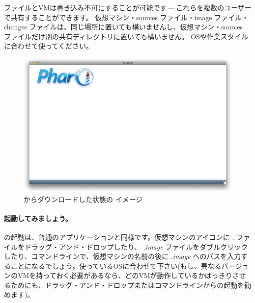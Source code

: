 \documentclass[a4paper,10pt,twoside]{book}
\begin{document}
 ファイルとVMは書き込み不可にすることが可能です\,---\,これらを複数のユーザーで共有することができます。
仮想マシン・sources ファイル・image ファイル・changes ファイルは、同じ場所に置いても構いませんし、仮想マシン・sources ファイルだけ別の共有ディレクトリに置いても構いません。
OSや作業スタイルに合わせて使ってください。


\begin{figure}[htb]
\centerline {\includegraphics[width=\textwidth]{startup}}
\caption{\pbe からダウンロードした状態の イメージ}
\end{figure}

\paragraph{起動してみましょう。} \pharo の起動は、普通のアプリケーションと同様です。仮想マシンのアイコンに \emph{.} ファイルをドラッグ・アンド・ドロップしたり、 \emph{.image} ファイルをダブルクリックしたり、コマンドラインで、仮想マシンの名前の後に \emph{.image} へのパスを入力することになるでしょう。使っているOSに合わせて下さい(もし、異なるバージョンのVMを持っておく必要があるなら、どのVMが動作しているかはっきりさせるためにも、ドラッグ・アンド・ドロップまたはコマンドラインからの起動を勧めます)。
\end{document}
